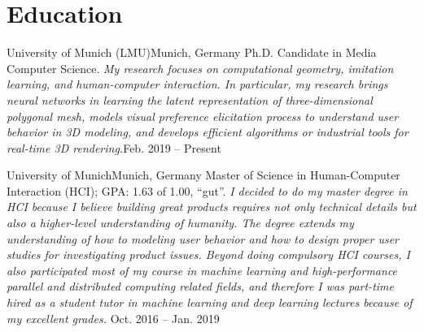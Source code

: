 \section{\textbf{Education}}
  \resumeSubHeadingListStartNoLabel

  \resumeSubheading
    {University of Munich (LMU)}{Munich, Germany}
    {Ph.D. Candidate in Media Computer Science.
    \newline
    \emph{My research focuses on computational geometry,
    imitation learning, and human-computer interaction. In particular, my research
    brings neural networks in learning the latent representation of three-dimensional polygonal mesh, 
    models visual preference elicitation process to understand user behavior in 3D modeling,
    and develops efficient algorithms or industrial tools for real-time 3D rendering.}}{Feb. 2019 -- Present}
    \resumeItemListStart
  \resumeItemListEnd


  \resumeSubheading
    {University of Munich}{Munich, Germany}
    {Master of Science in Human-Computer Interaction (HCI); GPA: 1.63 of 1.00, ``gut''.
    \newline
    \emph{
      I decided to do my master degree in HCI because I believe building great products 
      requires not only technical details but also a higher-level understanding of humanity. 
      The degree extends my understanding of how to modeling user behavior and 
      how to design proper user studies for investigating product issues. 
      Beyond doing compulsory HCI courses, 
      I also participated most of my course in machine learning and high-performance parallel 
      and distributed computing related fields, 
      and therefore I was part-time hired as a student tutor in machine learning 
      and deep learning lectures because of my excellent grades.}
    }{Oct. 2016 -- Jan. 2019}
  \resumeItemListStart
  \resumeItemListEnd


